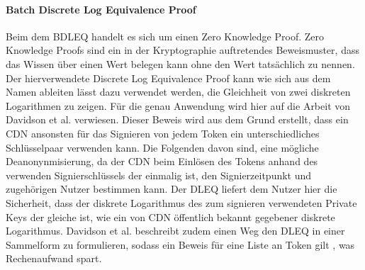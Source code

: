 \documentclass{scrreprt}
\begin{document}
\paragraph{Batch Discrete Log Equivalence Proof}
Beim dem BDLEQ handelt es sich um einen Zero Knowledge Proof. Zero Knowledge Proofs sind ein in der Kryptographie auftretendes Beweismuster, dass das Wissen über einen Wert belegen kann ohne den Wert tatsächlich zu nennen. Der hierverwendete Discrete Log Equivalence Proof kann wie sich aus dem Namen ableiten lässt dazu verwendet werden, die Gleichheit von zwei diskreten Logarithmen zu zeigen. Für die genau Anwendung wird hier auf die Arbeit von Davidson et al. \cite{pp-davidson2018privacy} verwiesen. Dieser Beweis wird aus dem Grund erstellt, dass ein CDN ansonsten für das Signieren von jedem Token ein unterschiedliches Schlüsselpaar verwenden kann. Die Folgenden davon sind, eine mögliche Deanonynmisierung, da der CDN beim Einlösen des Tokens anhand des verwenden Signierschlüssels der einmalig ist, den Signierzeitpunkt und zugehörigen Nutzer bestimmen kann. Der DLEQ liefert dem Nutzer hier die Sicherheit, dass der diskrete Logarithmus des zum signieren verwendeten Private Keys der gleiche ist, wie ein von CDN öffentlich bekannt gegebener diskrete Logarithmus. Davidson et al. beschreibt zudem einen Weg den DLEQ in einer Sammelform zu formulieren, sodass ein Beweis für eine Liste an Token gilt \cite{pp-davidson2018privacy}, was Rechenaufwand spart.\\\\
\end{document}
